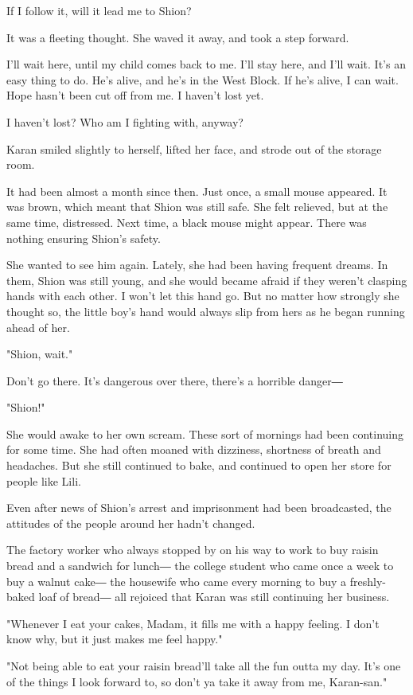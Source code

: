 If I follow it, will it lead me to Shion?

It was a fleeting thought. She waved it away, and took a step forward.

I'll wait here, until my child comes back to me. I'll stay here, and
I'll wait. It's an easy thing to do. He's alive, and he's in the West
Block. If he's alive, I can wait. Hope hasn't been cut off from me. I
haven't lost yet.

I haven't lost? Who am I fighting with, anyway?

Karan smiled slightly to herself, lifted her face, and strode out of the
storage room.

It had been almost a month since then. Just once, a small mouse
appeared. It was brown, which meant that Shion was still safe. She felt
relieved, but at the same time, distressed. Next time, a black mouse
might appear. There was nothing ensuring Shion's safety.

She wanted to see him again. Lately, she had been having frequent
dreams. In them, Shion was still young, and she would became afraid if
they weren't clasping hands with each other. I won't let this hand go.
But no matter how strongly she thought so, the little boy's hand would
always slip from hers as he began running ahead of her.

"Shion, wait."

Don't go there. It's dangerous over there, there's a horrible danger―

"Shion!"

She would awake to her own scream. These sort of mornings had been
continuing for some time. She had often moaned with dizziness, shortness
of breath and headaches. But she still continued to bake, and continued
to open her store for people like Lili.

Even after news of Shion's arrest and imprisonment had been broadcasted,
the attitudes of the people around her hadn't changed.

The factory worker who always stopped by on his way to work to buy
raisin bread and a sandwich for lunch― the college student who came once
a week to buy a walnut cake― the housewife who came every morning to buy
a freshly-baked loaf of bread― all rejoiced that Karan was still
continuing her business.

"Whenever I eat your cakes, Madam, it fills me with a happy feeling. I
don't know why, but it just makes me feel happy."

"Not being able to eat your raisin bread'll take all the fun outta my
day. It's one of the things I look forward to, so don't ya take it away
from me, Karan-san."

